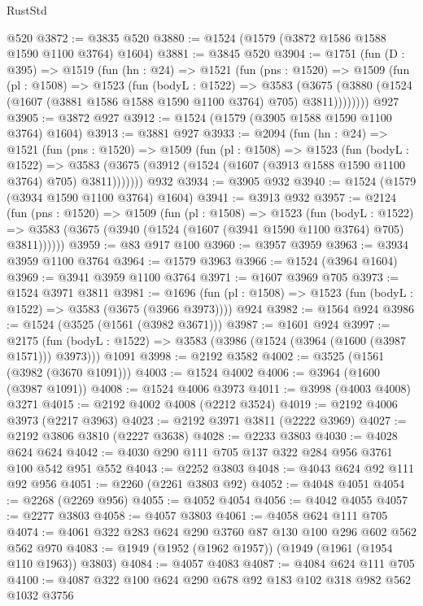 \begin{lexlean}{RustStd}
\begin{coremodule}
    @520
@3872 := @3835 @520
@3880 := @1524 (@1579 (@3872 @1586 @1588 @1590 @1100 @3764) @1604)
@3881 := @3845 @520
@3904 := @1751
    (fun (D : @395) =>
    @1519
      (fun (hn : @24) =>
      @1521
        (fun (pns : @1520) =>
        @1509
          (fun (pl : @1508) =>
          @1523
            (fun (bodyL : @1522) =>
            @3583
              (@3675 (@3880 (@1524 (@1607 (@3881 @1586 @1588 @1590 @1100 @3764) @705) @3811))))))))
    @927
@3905 := @3872 @927
@3912 := @1524 (@1579 (@3905 @1588 @1590 @1100 @3764) @1604)
@3913 := @3881 @927
@3933 := @2094
    (fun (hn : @24) =>
    @1521
      (fun (pns : @1520) =>
      @1509
        (fun (pl : @1508) =>
        @1523
          (fun (bodyL : @1522) =>
          @3583 (@3675 (@3912 (@1524 (@1607 (@3913 @1588 @1590 @1100 @3764) @705) @3811)))))))
    @932
@3934 := @3905 @932
@3940 := @1524 (@1579 (@3934 @1590 @1100 @3764) @1604)
@3941 := @3913 @932
@3957 := @2124
    (fun (pns : @1520) =>
    @1509
      (fun (pl : @1508) =>
      @1523
        (fun (bodyL : @1522) =>
        @3583 (@3675 (@3940 (@1524 (@1607 (@3941 @1590 @1100 @3764) @705) @3811))))))
@3959 := @83 @917 @100
@3960 := @3957 @3959
@3963 := @3934 @3959 @1100 @3764
@3964 := @1579 @3963
@3966 := @1524 (@3964 @1604)
@3969 := @3941 @3959 @1100 @3764
@3971 := @1607 @3969 @705
@3973 := @1524 @3971 @3811
@3981 := @1696 (fun (pl : @1508) => @1523 (fun (bodyL : @1522) => @3583 (@3675 (@3966 @3973)))) @924
@3982 := @1564 @924
@3986 := @1524 (@3525 (@1561 (@3982 @3671)))
@3987 := @1601 @924
@3997 := @2175
    (fun (bodyL : @1522) => @3583 (@3986 (@1524 (@3964 (@1600 (@3987 @1571))) @3973)))
    @1091
@3998 := @2192 @3582
@4002 := @3525 (@1561 (@3982 (@3670 @1091)))
@4003 := @1524 @4002
@4006 := @3964 (@1600 (@3987 @1091))
@4008 := @1524 @4006 @3973
@4011 := @3998 (@4003 @4008) @3271
@4015 := @2192 @4002 @4008 (@2212 @3524)
@4019 := @2192 @4006 @3973 (@2217 @3963)
@4023 := @2192 @3971 @3811 (@2222 @3969)
@4027 := @2192 @3806 @3810 (@2227 @3638)
@4028 := @2233 @3803
@4030 := @4028 @624 @624
@4042 := @4030 @290 @111 @705 @137 @322 @284 @956 @3761 @100 @542 @951 @552
@4043 := @2252 @3803
@4048 := @4043 @624 @92 @111 @92 @956
@4051 := @2260 (@2261 @3803 @92)
@4052 := @4048 @4051
@4054 := @2268 (@2269 @956)
@4055 := @4052 @4054
@4056 := @4042 @4055
@4057 := @2277 @3803
@4058 := @4057 @3803
@4061 := @4058 @624 @111 @705
@4074 := @4061 @322 @283 @624 @290 @3760 @87 @130 @100 @296 @602 @562 @562 @970
@4083 := @1949 (@1952 (@1962 @1957)) (@1949 (@1961 (@1954 @110 @1963)) @3803)
@4084 := @4057 @4083
@4087 := @4084 @624 @111 @705
@4100 := @4087 @322 @100 @624 @290 @678 @92 @183 @102 @318 @982 @562 @1032 @3756

\end{coremodule}
\end{lexlean}
